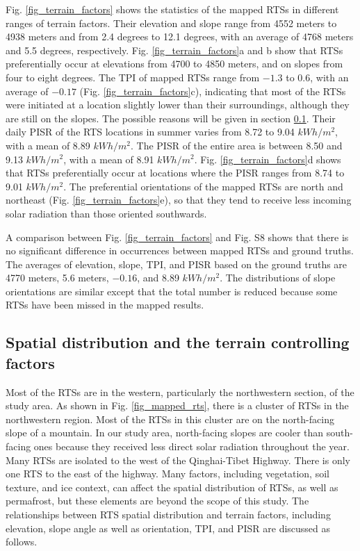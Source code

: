 \documentclass[authoryear,preprint,review,12pt]{elsarticle}
\begin{document}
Fig. \ref{fig_terrain_factors} shows the statistics of the mapped RTSs in different ranges of terrain factors. Their elevation and slope range from 4552 meters to 4938 meters and from 2.4 degrees to 12.1 degrees, with an average of 4768 meters and 5.5 degrees, respectively. Fig. \ref{fig_terrain_factors}a and b show that RTSs preferentially occur at elevations from 4700 to 4850 meters, and on slopes from four to eight degrees. The TPI of mapped RTSs range from $-1.3$ to 0.6, with an average of $-0.17$ (Fig. \ref{fig_terrain_factors}c), indicating that most of the RTSs were initiated at a location slightly lower than their surroundings, although they are still on the slopes. The possible reasons will be given in section \ref{subsec_rts_spatial}. Their daily PISR of the RTS locations in summer varies from 8.72 to 9.04 $kWh/m^2$, with a mean of 8.89 $kWh/m^2$. The PISR of the entire area is between 8.50 and 9.13 $kWh/m^2$, with a mean of 8.91 $kWh/m^2$. Fig. \ref{fig_terrain_factors}d shows that RTSs preferentially occur at locations where the PISR ranges from 8.74 to 9.01 $kWh/m^2$.
The preferential orientations of the mapped RTSs are north and northeast (Fig. \ref{fig_terrain_factors}e), so that they tend to receive less incoming solar radiation than those oriented southwards. 

A comparison between Fig. \ref{fig_terrain_factors} and Fig. S8 shows that there is no significant difference in occurrences between mapped RTSs and ground truths. The averages of elevation, slope, TPI, and PISR based on the ground truths are 4770 meters, 5.6 meters, $-0.16$, and 8.89 $kWh/m^2$. The distributions of slope orientations are similar except that the total number is reduced because some RTSs have been missed in the mapped results. 

\subsection{Spatial distribution and the terrain controlling factors}
\label{subsec_rts_spatial}

Most of the RTSs are in the western, particularly the northwestern section, of the study area. As shown in Fig. \ref{fig_mapped_rts}, there is a cluster of RTSs in the northwestern region. Most of the RTSs in this cluster are on the north-facing slope of a mountain. In our study area, north-facing slopes are cooler than south-facing ones because they received less direct solar radiation throughout the year. Many RTSs are isolated to the west of the Qinghai-Tibet Highway. There is only one RTS to the east of the highway. Many factors, including vegetation, soil texture, and ice context, can affect the spatial distribution of RTSs, as well as permafrost, but these elements are beyond the scope of this study. The relationships between RTS spatial distribution and terrain factors, including elevation, slope angle as well as orientation, TPI, and PISR are discussed as follows.
\end{document}
